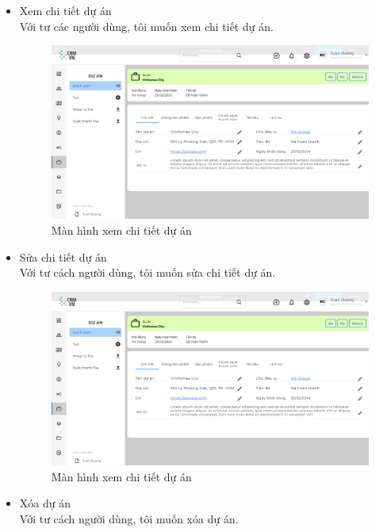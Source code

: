 \documentclass[12pt,a4paper]{article}
\begin{document}
\begin{enumerate}
\begin{itemize}
            \item Xem chi tiết dự án \\
            Với tư các người dùng, tôi muốn xem chi tiết dự án.

            \begin{figure}[H]
                \centering \includegraphics[width=\textwidth]{Img/Nguyet/DuAn/chitietda.png}
                \vspace{0.5cm}
                \caption{Màn hình xem chi tiết dự án }
                \label{ctduan}
            \end{figure}

            \item Sửa chi tiết dự án \\
            Với tư cách người dùng, tôi muốn sửa chi tiết dự án.

            \begin{figure}[H]
                \centering \includegraphics[width=\textwidth]{Img/Nguyet/DuAn/chitietda.png}
                \vspace{0.5cm}
                \caption{Màn hình xem chi tiết dự án }
                \label{suaduan}
            \end{figure}
            \item Xóa dự án \\
            Với tư cách người dùng, tôi muốn xóa dự án.



\end{itemize}
\end{enumerate}
\end{document}
